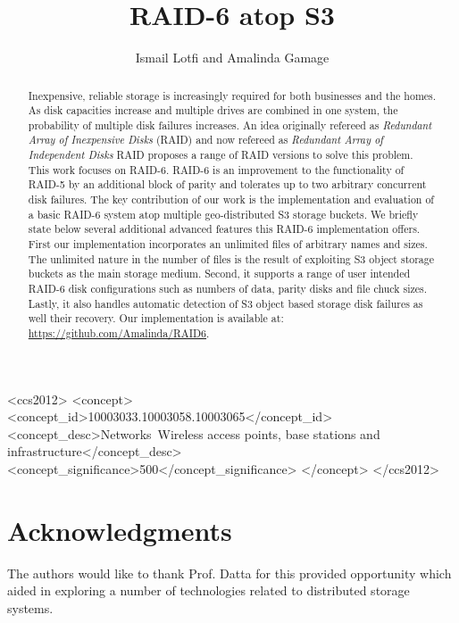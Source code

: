 \documentclass[sigconf,10pt]{acmart}
\begin{document}
\title{RAID-6 atop S3}

\author{Ismail Lotfi and Amalinda Gamage}


\begin{abstract}
Inexpensive, reliable storage is increasingly required for both businesses and the homes.
As disk capacities increase and multiple drives are combined in one system, the probability of multiple disk failures increases.
An idea originally refereed as \textit{Redundant Array of Inexpensive Disks}  (RAID) and now refereed as \textit{Redundant Array of Independent Disks} RAID proposes a range of RAID versions to solve this problem.
This work focuses on RAID-6.
RAID-6 is an improvement to the functionality of RAID-5 by an additional block of parity and tolerates up to two arbitrary concurrent disk failures.
The key contribution of our work is the implementation and evaluation of a basic RAID-6 system atop multiple geo-distributed S3 storage buckets.
We briefly state below several additional advanced features this RAID-6 implementation offers.
First our implementation incorporates an unlimited files of arbitrary names and sizes.
The unlimited nature in the number of files is the result of exploiting S3 object storage buckets as the main storage medium.
Second, it supports a range of user intended RAID-6 disk configurations such as numbers of data, parity disks and file chuck sizes.
Lastly, it also handles automatic detection of S3 object based storage disk failures as well their recovery.
Our implementation is available at: \url{https://github.com/Amalinda/RAID6}.
\end{abstract}

\begin{CCSXML}
<ccs2012>
   <concept>
       <concept_id>10003033.10003058.10003065</concept_id>
       <concept_desc>Networks~Wireless access points, base stations and infrastructure</concept_desc>
       <concept_significance>500</concept_significance>
       </concept>
</ccs2012>
\end{CCSXML}


\maketitle







\section*{Acknowledgments}
The authors would like to thank Prof. Datta for this provided opportunity which aided in exploring a number of technologies related to distributed storage systems.

\balance


\end{document}

